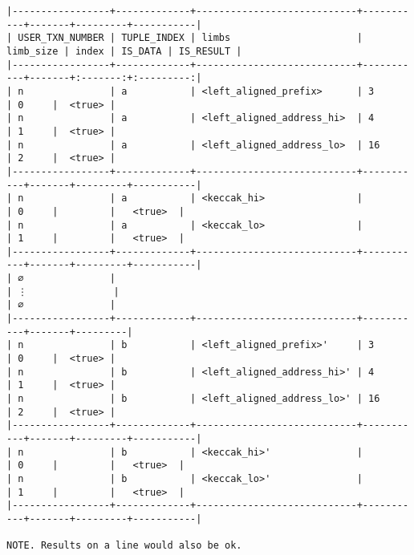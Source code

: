\documentclass[varwidth=\maxdimen,margin=0.5cm,multi={verbatim}]{standalone}
\begin{document}
\begin{verbatim}
|-----------------+-------------+----------------------------+-----------+-------+---------+-----------|
| USER_TXN_NUMBER | TUPLE_INDEX | limbs                      | limb_size | index | IS_DATA | IS_RESULT |
|-----------------+-------------+----------------------------+-----------+-------+:-------:+:---------:|
| n               | a           | <left_aligned_prefix>      | 3         | 0     |  <true> |
| n               | a           | <left_aligned_address_hi>  | 4         | 1     |  <true> |
| n               | a           | <left_aligned_address_lo>  | 16        | 2     |  <true> |
|-----------------+-------------+----------------------------+-----------+-------+---------+-----------|
| n               | a           | <keccak_hi>                |           | 0     |         |   <true>  |
| n               | a           | <keccak_lo>                |           | 1     |         |   <true>  |
|-----------------+-------------+----------------------------+-----------+-------+---------+-----------|
| ∅               |
| ⋮               |
| ∅               |
|-----------------+-------------+----------------------------+-----------+-------+---------|
| n               | b           | <left_aligned_prefix>'     | 3         | 0     |  <true> |
| n               | b           | <left_aligned_address_hi>' | 4         | 1     |  <true> |
| n               | b           | <left_aligned_address_lo>' | 16        | 2     |  <true> |
|-----------------+-------------+----------------------------+-----------+-------+---------+-----------|
| n               | b           | <keccak_hi>'               |           | 0     |         |   <true>  |
| n               | b           | <keccak_lo>'               |           | 1     |         |   <true>  |
|-----------------+-------------+----------------------------+-----------+-------+---------+-----------|

NOTE. Results on a line would also be ok.

\end{verbatim}
\end{document}
